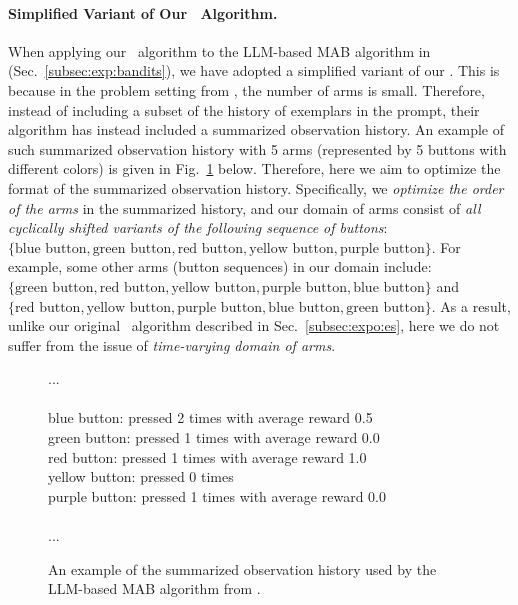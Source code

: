 \paragraph{Simplified Variant of Our \alges~Algorithm.}
When applying our \alges~algorithm to the LLM-based MAB algorithm in \citet{krishnamurthy2024can} (Sec.~\ref{subsec:exp:bandits}), we have adopted a simplified variant of our \alges.
This is because in the problem setting from \citet{krishnamurthy2024can}, the number of arms is small. Therefore, instead of including a subset of the history of exemplars in the prompt, their algorithm has instead included a summarized observation history.
An example of such summarized observation history with 5 arms (represented by 5 buttons with different colors) is given in Fig.~\ref{fig:example:summarized:history} below.
Therefore, here we aim to optimize the format of the summarized observation history.
Specifically, we \emph{optimize the order of the arms} in the summarized history, and our domain of arms consist of \emph{all cyclically shifted variants of the following sequence of buttons}: $\{\text{blue button}, \text{green button}, \text{red button}, \text{yellow button}, \text{purple button}\}$.
For example, some other arms (button sequences) in our domain include: $\{\text{green button}, \text{red button}, \text{yellow button}, \text{purple button}, \text{blue button}\}$ and $\{\text{red button}, \text{yellow button}, \text{purple button}, \text{blue button}, \text{green button}\}$.
As a result, unlike our original \alges~algorithm described in Sec.~\ref{subsec:expo:es}, here we do not suffer from the issue of \emph{time-varying domain of arms}.
\begin{figure}[h]
\begin{mdframed}[linewidth=0.9pt]  %
\footnotesize  %
...\\\\
blue button: pressed 2 times with average reward 0.5 \\
green button: pressed 1 times with average reward 0.0 \\
red button: pressed 1 times with average reward 1.0 \\
yellow button: pressed 0 times \\
purple button: pressed 1 times with average reward 0.0 \\\\
...
\end{mdframed}
\caption{
An example of the summarized observation history used by the LLM-based MAB algorithm from \citet{krishnamurthy2024can}.
}
\label{fig:example:summarized:history}
\end{figure}

